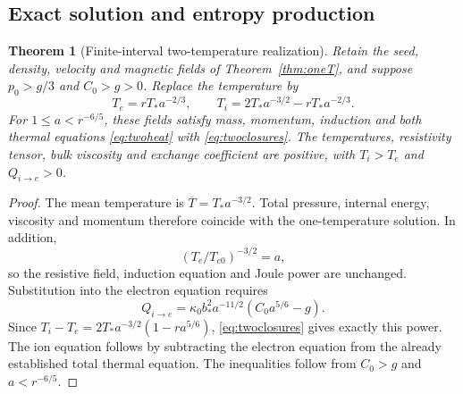 \documentclass[11pt,a4paper]{article}
\newtheorem{theorem}{Theorem}
\theoremstyle{remark}\newtheorem{remark}{Remark}
\numberwithin{equation}{section}
\begin{document}
\subsection{Exact solution and entropy production}
\begin{theorem}[Finite-interval two-temperature realization]\label{thm:twoT}
Retain the seed, density, velocity and magnetic fields of Theorem~\ref{thm:oneT}, and suppose $p_0>g/3$ and $C_0>g>0$. Replace the temperature by
\begin{equation}
T_e=rT_*a^{-2/3},\qquad
T_i=2T_*a^{-3/2}-rT_*a^{-2/3}.
\label{eq:twotemperatures}
\end{equation}
For $1\le a<r^{-6/5}$, these fields satisfy mass, momentum, induction and both thermal equations \eqref{eq:twoheat} with \eqref{eq:twoclosures}. The temperatures, resistivity tensor, bulk viscosity and exchange coefficient are positive, with $T_i>T_e$ and $Q_{i\to e}>0$.
\end{theorem}
\begin{proof}
The mean temperature is $\overline T=T_*a^{-3/2}$. Total pressure, internal energy, viscosity and momentum therefore coincide with the one-temperature solution. In addition,
\[
(T_e/T_{e0})^{-3/2}=a,
\]
so the resistive field, induction equation and Joule power are unchanged. Substitution into the electron equation requires
\begin{equation}
Q_{i\to e}=\kappa_0b_*^2a^{-11/2}(C_0a^{5/6}-g).
\label{eq:exchangepower}
\end{equation}
Since $T_i-T_e=2T_*a^{-3/2}(1-ra^{5/6})$, \eqref{eq:twoclosures} gives exactly this power. The ion equation follows by subtracting the electron equation from the already established total thermal equation. The inequalities follow from $C_0>g$ and $a<r^{-6/5}$.
\end{proof}
\end{document}
